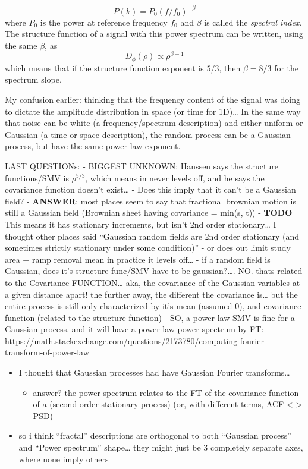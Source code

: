 \[P(k) = P_0 \left(f/f_0\right)^{-\beta}\] where \(P_0\) is the power at
reference frequency \(f_0\) and \(\beta\) is called the \emph{spectral
index}. The structure function of a signal with this power spectrum can
be written, using the same \(\beta\), as
\[D_{\phi}(\rho) \propto \rho^{\beta-1}\] which means that if the
structure function exponent is \(5/3\), then \(\beta=8/3\) for the
spectrum slope.

My confusion earlier: thinking that the frequency content of the signal
was doing to dictate the amplitude distribution in space (or time for
1D)\ldots{} In the same way that noise can be white (a
frequency/spectrum description) and either uniform or Gaussian (a time
or space description), the random process can be a Gaussian process, but
have the same power-law exponent.

LAST QUESTIONs: - BIGGEST UNKNOWN: Hanssen says the structure
functions/SMV is \(\rho^{5/3}\), which means in never levels off, and he
says the covariance function doesn't exist\ldots{} - Does this imply
that it can't be a Gaussian field? - \textbf{ANSWER}: most places seem
to say that fractional brownian motion is still a Gaussian field
(Brownian sheet having covariance = min(s, t)) - \textbf{TODO} This
means it has stationary increments, but isn't 2nd order
stationary\ldots{} I thought other places said ``Gaussian random fields
are 2nd order stationary (and sometimes strictly stationary under some
condition)'' - or does out limit study area + ramp removal mean in
practice it levels off\ldots{} - if a random field is Gaussian, does
it's structure func/SMV have to be gaussian?\ldots{}. NO. thats related
to the Covariance FUNCTION\ldots{} aka, the covariance of the Gaussian
variables at a given distance apart! the further away, the different the
covariance is\ldots{} but the entire process is still only characterized
by it's mean (assumed 0), and covariance function (related to the
structure function) - SO, a power-law SMV is fine for a Gaussian
process. and it will have a power law power-spectrum by FT:
https://math.stackexchange.com/questions/2173780/computing-fourier-transform-of-power-law

\begin{itemize}
\tightlist
\item
  I thought that Gaussian processes had have Gaussian Fourier
  transforms\ldots{}

  \begin{itemize}
  \tightlist
  \item
    answer? the power spectrum relates to the FT of the covariance
    function of a (second order stationary process) (or, with different
    terms, ACF \textless{}-\textgreater{} PSD)
  \end{itemize}
\item
  so i think ``fractal'' descriptions are orthogonal to both ``Gaussian
  process'' and ``Power spectrum'' shape\ldots{} they might just be 3
  completely separate axes, where none imply others
\end{itemize}

